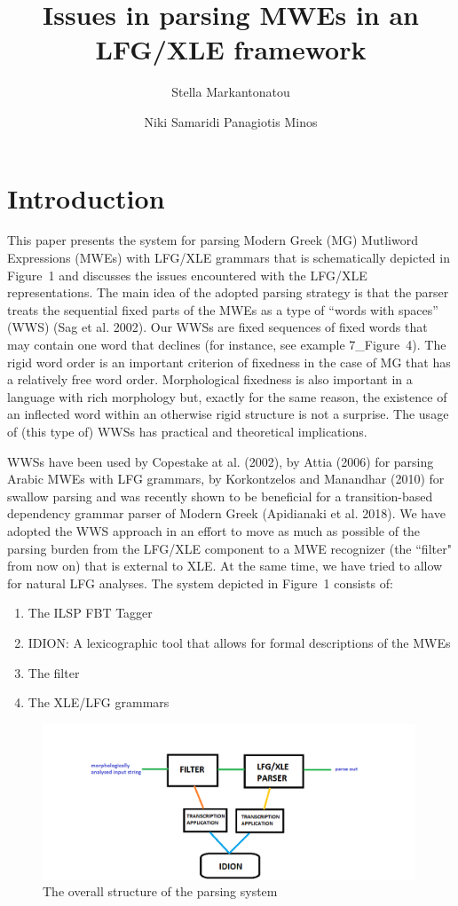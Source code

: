 \documentclass[output=paper,
modfonts
]{langscibook}
\title{Issues in parsing MWEs in an LFG/XLE framework}
\author{%
  Stella Markantonatou\affiliation{Institute for Language and Speech Processing / Athena RIC}\and
  Niki Samaridi\affiliation{Institute for Language and Speech Processing / Athena RIC}\lastand
  Panagiotis Minos\affiliation{Institute for Language and Speech Processing / Athena RIC}
}
\begin{document}
\maketitle

\section{Introduction} 
This paper presents the system for parsing Modern Greek (MG) Mutliword Expressions (MWEs) with LFG/XLE grammars that is schematically depicted in Figure~1 and discusses the issues encountered with the LFG/XLE representations. The main idea of the adopted parsing strategy is that the parser treats the sequential fixed parts of the MWEs as a type of ``words with spaces” (WWS) (Sag et al. 2002). Our  WWSs are fixed sequences of fixed words that may contain one word that declines (for instance, see example 7\_Figure~4). The rigid word order is an important criterion of fixedness in the case of MG that has a relatively free word order. Morphological fixedness is also important in a language with rich morphology but, exactly for the same reason, the existence of an inflected word within an otherwise rigid structure is not a surprise. The usage of (this type of) WWSs has practical and theoretical implications. 

WWSs have been used by Copestake at al. (2002), by Attia (2006) for parsing Arabic MWEs with LFG grammars, by Korkontzelos and Manandhar (2010) for swallow parsing and was recently shown to be beneficial for a transition-based dependency grammar parser of Modern Greek (Apidianaki et al. 2018). We have adopted the WWS approach in an effort to move as much as possible of the parsing burden from the LFG/XLE component to a MWE recognizer (the ``filter" from now on) that is external to XLE. At the same time, we have tried to allow for natural LFG analyses. 
The system depicted in Figure~1 consists of:
\begin{enumerate}
\item The ILSP FBT Tagger
\item IDION:  A lexicographic tool that allows for formal descriptions of the MWEs 
\item The filter
\item The XLE/LFG grammars
\end{enumerate}

\vspace{-.7cm}

\begin{figure}[h!]
  \caption{The overall structure of the parsing system}
  \centering
  \includegraphics[width=0.99\textwidth]{figures/picture}
\end{figure}
\end{document}
